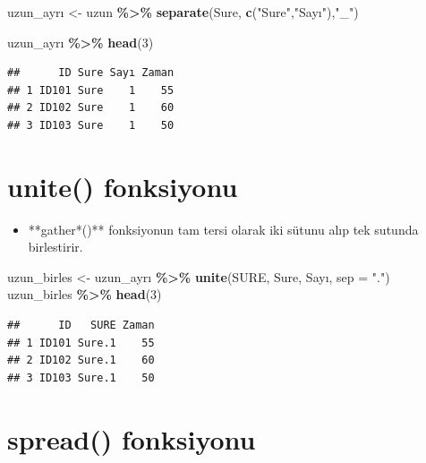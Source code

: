 \documentclass[
  oneside]{book}
\newenvironment{Shaded}{\begin{snugshade}}{\end{snugshade}}
\newcommand{\AttributeTok}[1]{\textcolor[rgb]{0.13,0.29,0.53}{#1}}
\newcommand{\DecValTok}[1]{\textcolor[rgb]{0.00,0.00,0.81}{#1}}
\newcommand{\FunctionTok}[1]{\textcolor[rgb]{0.13,0.29,0.53}{\textbf{#1}}}
\newcommand{\NormalTok}[1]{#1}
\newcommand{\OtherTok}[1]{\textcolor[rgb]{0.56,0.35,0.01}{#1}}
\newcommand{\SpecialCharTok}[1]{\textcolor[rgb]{0.81,0.36,0.00}{\textbf{#1}}}
\newcommand{\StringTok}[1]{\textcolor[rgb]{0.31,0.60,0.02}{#1}}
\providecommand{\tightlist}{%
  \setlength{\itemsep}{0pt}\setlength{\parskip}{0pt}}
\begin{document}
\begin{Shaded}
\begin{Highlighting}[]
\NormalTok{uzun\_ayrı }\OtherTok{\textless{}{-}}\NormalTok{ uzun }\SpecialCharTok{\%\textgreater{}\%} 
            \FunctionTok{separate}\NormalTok{(Sure, }\FunctionTok{c}\NormalTok{(}\StringTok{"Sure"}\NormalTok{,}\StringTok{"Sayı"}\NormalTok{),}\StringTok{"\_"}\NormalTok{) }

\NormalTok{uzun\_ayrı }\SpecialCharTok{\%\textgreater{}\%} \FunctionTok{head}\NormalTok{(}\DecValTok{3}\NormalTok{)}
\end{Highlighting}
\end{Shaded}

\begin{verbatim}
##      ID Sure Sayı Zaman
## 1 ID101 Sure    1    55
## 2 ID102 Sure    1    60
## 3 ID103 Sure    1    50
\end{verbatim}

\hypertarget{unite-fonksiyonu}{%
\section{\texorpdfstring{\textbf{unite()} fonksiyonu}{unite() fonksiyonu}}\label{unite-fonksiyonu}}

\begin{itemize}
\tightlist
\item
  **gather*()** fonksiyonun tam tersi olarak iki sütunu alıp
  tek sutunda birlestirir.
\end{itemize}

\begin{Shaded}
\begin{Highlighting}[]
\NormalTok{uzun\_birles }\OtherTok{\textless{}{-}}\NormalTok{ uzun\_ayrı }\SpecialCharTok{\%\textgreater{}\%} \FunctionTok{unite}\NormalTok{(SURE, Sure, Sayı, }\AttributeTok{sep =} \StringTok{"."}\NormalTok{)}
\NormalTok{uzun\_birles }\SpecialCharTok{\%\textgreater{}\%} \FunctionTok{head}\NormalTok{(}\DecValTok{3}\NormalTok{)}
\end{Highlighting}
\end{Shaded}

\begin{verbatim}
##      ID   SURE Zaman
## 1 ID101 Sure.1    55
## 2 ID102 Sure.1    60
## 3 ID103 Sure.1    50
\end{verbatim}

\hypertarget{spread-fonksiyonu}{%
\section{\texorpdfstring{\textbf{spread()} fonksiyonu}{spread() fonksiyonu}}\label{spread-fonksiyonu}}
\end{document}
